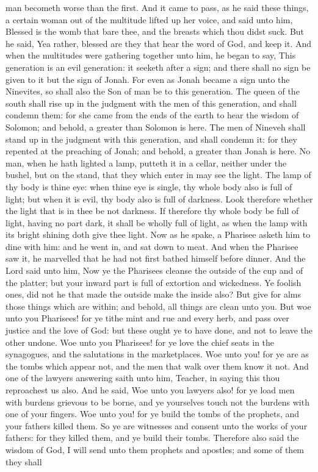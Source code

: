 man becometh worse than the first.  And it came to pass, as he said these things, a certain woman out of the multitude lifted up her voice, and said unto him, Blessed is the womb that bare thee, and the breasts which thou didst suck. But he said, Yea rather, blessed are they that hear the word of God, and keep it.  And when the multitudes were gathering together unto him, he began to say, This generation is an evil generation: it seeketh after a sign; and there shall no sign be given to it but the sign of Jonah. For even as Jonah became a sign unto the Ninevites, so shall also the Son of man be to this generation. The queen of the south shall rise up in the judgment with the men of this generation, and shall condemn them: for she came from the ends of the earth to hear the wisdom of Solomon; and behold, a greater than Solomon is here. The men of Nineveh shall stand up in the judgment with this generation, and shall condemn it: for they repented at the preaching of Jonah; and behold, a greater than Jonah is here.  No man, when he hath lighted a lamp, putteth it in a cellar, neither under the bushel, but on the stand, that they which enter in may see the light. The lamp of thy body is thine eye: when thine eye is single, thy whole body also is full of light; but when it is evil, thy body also is full of darkness. Look therefore whether the light that is in thee be not darkness. If therefore thy whole body be full of light, having no part dark, it shall be wholly full of light, as when the lamp with its bright shining doth give thee light.  Now as he spake, a Pharisee asketh him to dine with him: and he went in, and sat down to meat. And when the Pharisee saw it, he marvelled that he had not first bathed himself before dinner. And the Lord said unto him, Now ye the Pharisees cleanse the outside of the cup and of the platter; but your inward part is full of extortion and wickedness. Ye foolish ones, did not he that made the outside make the inside also? But give for alms those things which are within; and behold, all things are clean unto you.  But woe unto you Pharisees! for ye tithe mint and rue and every herb, and pass over justice and the love of God: but these ought ye to have done, and not to leave the other undone. Woe unto you Pharisees! for ye love the chief seats in the synagogues, and the salutations in the marketplaces. Woe unto you! for ye are as the tombs which appear not, and the men that walk over them know it not.  And one of the lawyers answering saith unto him, Teacher, in saying this thou reproachest us also. And he said, Woe unto you lawyers also! for ye load men with burdens grievous to be borne, and ye yourselves touch not the burdens with one of your fingers. Woe unto you! for ye build the tombs of the prophets, and your fathers killed them. So ye are witnesses and consent unto the works of your fathers: for they killed them, and ye build their tombs. Therefore also said the wisdom of God, I will send unto them prophets and apostles; and some of them they shall 